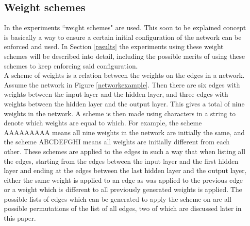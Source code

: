 \documentclass[a4paper, 10pt, notitlepage, twocolumn]{article}
\begin{document}
   
   \subsection{Weight schemes}
	  In the experiments ``weight schemes" are used. This soon to be explained concept is basically a way to ensure a certain initial configuration of the network can be enforced and used. In Section \ref{results} the experiments using these weight schemes will be described into detail, including the possible merits of using these schemes to keep enforcing said configuration.\\
      A scheme of weights is a relation between the weights on the edges in a network. Assume the network in Figure \ref{networkexample}. Then there are six edges with weights between the input layer and the hidden layer,  and three edges with weights between the hidden layer and the output layer. This gives a total of nine weights in the network. A scheme is then made using characters in a string to denote which weights are equal to which. For example,  the scheme AAAAAAAAA means all nine weights in the network are initially the same,  and the scheme ABCDEFGHI means all weights are initially different from each other. These schemes are applied to the edges in such a way that when listing all the edges,  starting from the edges between the input layer and the first hidden layer and ending at the edges between the last hidden layer and the output layer,  either the same weight is applied to an edge as was applied to the previous edge or a weight which is different to all previously generated weights is applied. The possible lists of edges which can be generated to apply the scheme on are all possible permutations of the list of all edges, two of which are discussed later in this paper.\\
\end{document}
